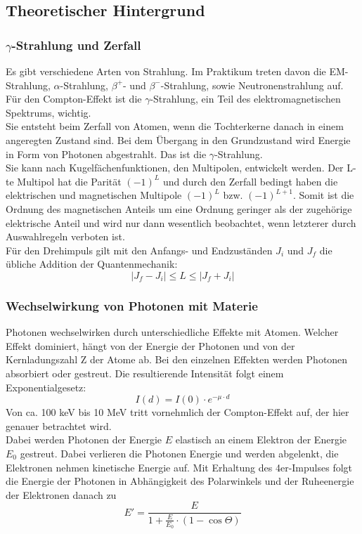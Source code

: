 \subsection{Theoretischer Hintergrund}
\subsubsection{$\gamma$-Strahlung und Zerfall}
Es gibt verschiedene Arten von Strahlung. Im Praktikum treten davon die EM-Strahlung, $\alpha$-Strahlung, $\beta^{+}$- und $\beta^{-}$-Strahlung, sowie Neutronenstrahlung auf. Für den Compton-Effekt ist die $\gamma$-Strahlung, ein Teil des elektromagnetischen Spektrums, wichtig. \\
Sie entsteht beim Zerfall von Atomen, wenn die Tochterkerne danach in einem angeregten Zustand sind. Bei dem Übergang in den Grundzustand wird Energie in Form von Photonen abgestrahlt. Das ist die $\gamma$-Strahlung. \\
Sie kann nach Kugelfächenfunktionen, den Multipolen, entwickelt werden. Der L-te Multipol hat die Parität $(-1)^{L}$ und durch den Zerfall bedingt haben die elektrischen und magnetischen Multipole $(-1)^{L}$ bzw. $(-1)^{L+1}$. Somit ist die Ordnung des magnetischen Anteils um eine Ordnung geringer als der zugehörige elektrische Anteil und wird nur dann wesentlich beobachtet, wenn letzterer durch Auswahlregeln verboten ist. \\
Für den Drehimpuls gilt mit den Anfangs- und Endzuständen $J_i$ und $J_f$ die übliche Addition der Quantenmechanik:
$$\vert J_f - J_i \vert \leq L \leq \vert J_f + J_i \vert $$ 

\subsubsection{Wechselwirkung von Photonen mit Materie}
Photonen wechselwirken durch unterschiedliche Effekte mit Atomen. Welcher Effekt dominiert, hängt von der Energie der Photonen und von der Kernladungszahl Z der Atome ab. Bei den einzelnen Effekten werden Photonen absorbiert oder gestreut. Die resultierende Intensität folgt einem Exponentialgesetz:
$$I(d) = I(0) \cdot e^{-\mu \cdot d} $$
Von ca. 100 keV bis 10 MeV tritt vornehmlich der Compton-Effekt auf, der hier genauer betrachtet wird. \\
Dabei werden Photonen der Energie $E$ elastisch an einem Elektron der Energie $E_0$ gestreut. Dabei verlieren die Photonen Energie und werden abgelenkt, die Elektronen nehmen kinetische Energie auf. Mit Erhaltung des 4er-Impulses folgt die Energie der Photonen in Abhängigkeit des Polarwinkels und der Ruheenergie der Elektronen danach zu
$$E' = \frac{E}{1 + \frac{E}{E_0} \cdot (1 - \cos \Theta)}$$

